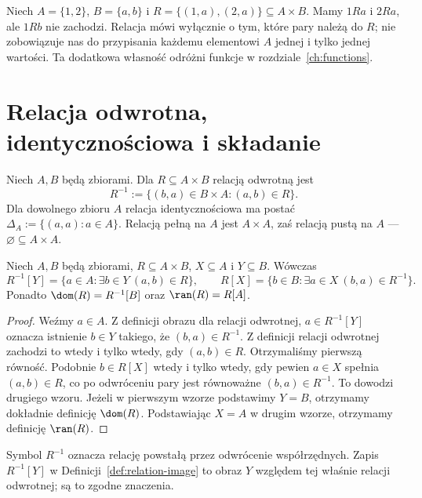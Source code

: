 \begin{przyklad}
Niech $A=\{1,2\}$, $B=\{a,b\}$ i
$R=\{(1,a),(2,a)\}\subseteq A\times B$.
Mamy $1Ra$ i $2Ra$, ale $1Rb$ nie zachodzi.
Relacja mówi wyłącznie o tym, które pary należą do $R$;
nie zobowiązuje nas do przypisania każdemu elementowi $A$
jednej i tylko jednej wartości. Ta dodatkowa własność
odróżni funkcje w rozdziale~\ref{ch:functions}.
\end{przyklad}

\section{Relacja odwrotna, identycznościowa i składanie}
\label{sec:relation-algebra}
\begin{definicja}
\label{def:inverse-identity-rel}
Niech $A,B$ będą zbiorami. Dla $R\subseteq A\times B$
relacją odwrotną jest
\[
R^{-1}:=\{(b,a)\in B\times A:(a,b)\in R\}.
\]
Dla dowolnego zbioru $A$ relacja identycznościowa ma postać
$\Delta_A:=\{(a,a):a\in A\}$.
Relacją pełną na $A$ jest $A\times A$, zaś relacją pustą
na $A$ --- $\varnothing\subseteq A\times A$.
\end{definicja}

\begin{twierdzenie}
\label{thm:inverse-rel-image}
Niech $A,B$ będą zbiorami, $R\subseteq A\times B$,
$X\subseteq A$ i $Y\subseteq B$. Wówczas
\[
R^{-1}[Y]=\{a\in A:\exists b\in Y\ (a,b)\in R\},
\qquad R[X]=\{b\in B:\exists a\in X\ (b,a)\in R^{-1}\}.
\]
Ponadto $\dom(R)=R^{-1}[B]$ oraz $\ran(R)=R[A]$.
\end{twierdzenie}
\begin{proof}
Weźmy $a\in A$. Z definicji obrazu dla relacji odwrotnej,
$a\in R^{-1}[Y]$ oznacza istnienie $b\in Y$ takiego,
że $(b,a)\in R^{-1}$. Z definicji relacji odwrotnej
zachodzi to wtedy i tylko wtedy, gdy $(a,b)\in R$.
Otrzymaliśmy pierwszą równość. Podobnie $b\in R[X]$
wtedy i tylko wtedy, gdy pewien $a\in X$ spełnia
$(a,b)\in R$, co po odwróceniu pary jest równoważne
$(b,a)\in R^{-1}$. To dowodzi drugiego wzoru.
Jeżeli w pierwszym wzorze podstawimy $Y=B$, otrzymamy
dokładnie definicję $\dom(R)$. Podstawiając $X=A$ w
drugim wzorze, otrzymamy definicję $\ran(R)$.
\end{proof}

\begin{uwaga}
Symbol $R^{-1}$ oznacza relację powstałą przez odwrócenie
współrzędnych. Zapis $R^{-1}[Y]$ w
Definicji~\ref{def:relation-image} to obraz $Y$ względem
tej właśnie relacji odwrotnej; są to zgodne znaczenia.
\end{uwaga}

